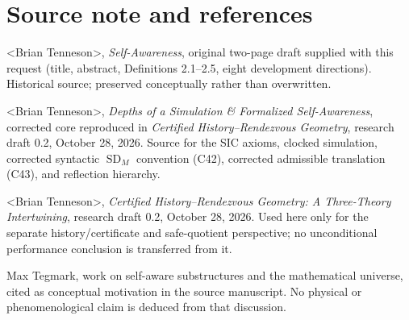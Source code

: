 \documentclass[11pt,letterpaper]{article}
\theoremstyle{definition}\newtheorem{definition}[theorem]{Definition}\newtheorem{example}[theorem]{Example}\newtheorem{protocol}[theorem]{Protocol}\newtheorem{question}[theorem]{Open Problem}
\theoremstyle{remark}\newtheorem{remark}[theorem]{Remark}
\newcommand{\SD}{\operatorname{SD}}
\begin{document}
\section*{Source note and references}
\begin{enumerate}[label={[\arabic*]},leftmargin=2.6em]
\item \textless{}Brian Tenneson\textgreater{}, \emph{Self-Awareness}, original two-page draft supplied with this request (title, abstract, Definitions 2.1--2.5, eight development directions). Historical source; preserved conceptually rather than overwritten.
\item \textless{}Brian Tenneson\textgreater{}, \emph{Depths of a Simulation \& Formalized Self-Awareness}, corrected core reproduced in \emph{Certified History--Rendezvous Geometry}, research draft 0.2, October 28, 2026. Source for the SIC axioms, clocked simulation, corrected syntactic $\SD_M$ convention (C42), corrected admissible translation (C43), and reflection hierarchy.
\item \textless{}Brian Tenneson\textgreater{}, \emph{Certified History--Rendezvous Geometry: A Three-Theory Intertwining}, research draft 0.2, October 28, 2026. Used here only for the separate history/certificate and safe-quotient perspective; no unconditional performance conclusion is transferred from it.
\item Max Tegmark, work on self-aware substructures and the mathematical universe, cited as conceptual motivation in the source manuscript. No physical or phenomenological claim is deduced from that discussion.
\end{enumerate}
\end{document}
